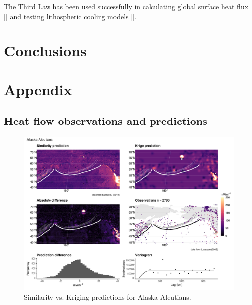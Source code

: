 \documentclass[draft,linenumbers]{agujournal2018}
\begin{document}
The Third Law has been used successfully in calculating global surface
heat flux {[}{]} and testing lithospheric cooling models {[}{]}.

\section{Conclusions}

\acknowledgments

\section*{Appendix}

\hypertarget{sec:comps}{%
\subsection*{Heat flow observations and predictions}\label{sec:comps}}

\begin{figure}[h]

{\centering \includegraphics[width=0.95\linewidth,]{../figs/diff/comp/Alaska_Aleutians} 

}

\caption{Similarity vs. Kriging predictions for Alaska Aleutians.}\label{fig:alaska.comp}
\end{figure}
\end{document}
